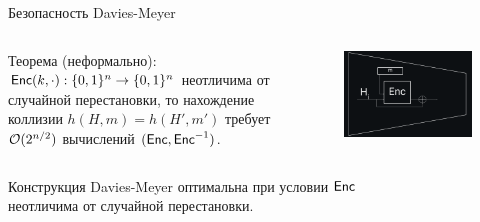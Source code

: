 \documentclass[usenames,dvipsnames,8pt,aspectratio=169]{beamer}
\begin{document}
\begin{frame}{Безопасность Davies-Meyer}

\LARGE
\begin{columns}[T]
	\begin{column}{0.6\textwidth}
		{\color{Orange} Теорема (неформально):}  $\textsf{Enc}(k, \cdot): \{0,1\}^n \rightarrow \{0,1\}^n$ неотличима от случайной перестановки, то нахождение коллизии $h(H, m) = h(H', m')$ требует $\mathcal{O}(2^{n/2})$ вычислений $(\textsf{Enc}, \textsf{Enc}^{-1})$.
	\end{column}
\begin{column}{0.4\textwidth}
\begin{figure}
	\includegraphics[width=\textwidth]{DaviesMeyerCompression}
\end{figure}
\end{column}
\end{columns}
\vspace{10pt}	

Конструкция Davies-Meyer оптимальна при условии $\textsf{Enc}$ \\ неотличима от случайной перестановки. 
\end{frame}
\end{document}
